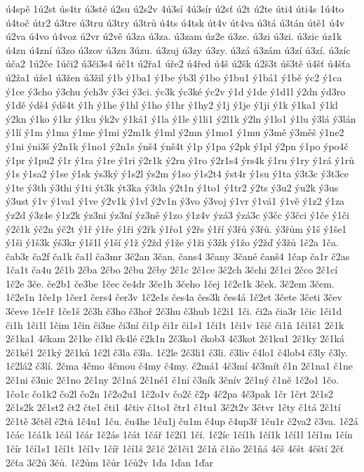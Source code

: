 {ú4spě
1ú2st
ús4tr
ú3sté
ú2su
ú2s2v
4ú3sí
4ú3sír
ú2sť
ú2t
ú2te
úti4
úti4s
1ú4to
ú4toč
útr2
ú3tre
ú3tru
ú3try
ú3trů
ú4ts
ú4tsk
út4v
út4va
ú3tá
ú3tán
útě1
ú4v
ú2va
ú4vo
ú4voz
ú2vr
ú2vě
ú3za
ú3za.
ú3zam
úz2e
ú3ze.
ú3zi
ú3zi.
ú3zic
úz1k
ú4zn
ú4zní
ú3zo
ú3zov
ú3zu
3úzu.
ú3zuj
ú3zy
ú3zy.
ú3zá
ú3zám
ú3zí
ú3zí.
ú3zíc
úča2
1ú2če
1úči2
ú3či3s4
úč1t
ú2řa1
úře2
ú4řed
ú4š
ú2šk
ú2š3t
úš3tě
ú4šť
ú4šťa
ú2ža1
úže1
ú3žen
ú3žil
ý1b
ý1ba1
ý1be
ýb3l
ý1bo
ý1bu1
ý1bá1
ý1bě
ýc2
ý1ca
ý1ce
ý3cho
ý3chu
ých3v
ý3ci
ý3ci.
ýc3k
ýc3ké
ýc2v
ý1d
ý1de
ý1d1l
ý2dn
ýd3ro
ý1dě
ýdš4
ýdš4t
ý1h
ý1he
ý1hl
ý1ho
ý1hr
ý1hy2
ý1j
ý1je
ý1ji
ý1k
ý1ka1
ý1kl
ý2kn
ý1ko
ý1kr
ý1ku
ýk2v
ý1ká1
ý1la
ý1le
ý1li1
ý2l1k
ý2ln
ý1lo1
ý1lu
ý3lá
ý3lán
ý1lí
ý1m
ý1ma
ý1me
ý1mi
ý2m1k
ý1ml
ý2mn
ý1mo1
ý1mu
ý3mě
ý3měš
ý1ne2
ý1ni
ýni3š
ý2n1k
ý1no1
ý2n1s
ýnš4
ýnš4t
ý1p
ý1pa
ý2pk
ý1pl
ý2pn
ý1po
ýpo4č
ý1pr
ý1pu2
ý1r
ý1ra
ý1re
ý1ri
ý2r1k
ý2rn
ý1ro
ý2r1s4
ýrs4k
ý1ru
ý1ry
ý1rá
ý1rů
ý1s
ý1sa2
ý1se
ý1sk
ýs3ký
ý1s2l
ýs2m
ý1so
ý1s2t4
ýst4r
ý1su
ý1ta
ý3t3c
ý3t3ce
ý1te
ý3th
ý3thi
ý1ti
ýt3k
ýt3ka
ý3tla
ý2t1n
ý1to1
ý1tr2
ý2ts
ý3u2
ýu2k
ý3us
ý3ust
ý1v
ý1va1
ý1ve
ý2v1k
ý1vl
ý2v1n
ý3vo
ý3voj
ý1vr
ý1vá1
ý1vě
ý1z2
ý1za
ýz2d
ý3z4e
ý1z2k
ýz3ni
ýz3ní
ýz3ně
ý1zo
ý1z4v
ýzá3
ýzá3c
ý3čc
ý3čci
ý1če
ý1či
ý2č1k
ýč2n
ýč2t
ý1ř
ý1ře
ý1ři
ý2řk
ý1řo1
ý2řs
ý1ří
ý3řů
ý3řů.
ý3řům
ý1š
ý1še1
ý1ši
ý1š3k
ýš3kr
ý1š1l
ý1ší
ý1ž
ý2žd
ý1že
ý1ži
ý3žk
ý1žo
ý2žď
ý3žů
1č2a
1ča.
čab3r
ča2f
ča1k
ča1l
ča3mr
3č2an
3čan.
čans4
3čany
3čané
čanš4
1čap
ča1r
č2as
1ča1t
ča4u
2č1b
2čba
2čbo
2čbu
2čby
2č1c
2č1ce
3č2ch
3čchi
2č1ci
2čco
2č1cí
1č2e
3če.
če2b1
če3be
1čec
če4dr
3če1h
3čeho
1čej
1č2e1k
3ček.
3č2em
3čem.
1č2e1n
1če1p
1čer1
čers4
čer3v
1č2e1s
čes4a
čes3k
čes4á
1č2et
3čete
3četi
3čev
3čeve
1če1ř
1če1š
2č3h
č3ho
č3hoř
2č3hu
č3hub
1č2i1
1či.
či2a
čia3r
1čic
1či1d
či1h
1či1l
1čim
1čin
či3ne
či3ní
či1p
či1r
či1s1
1či1t
1či1v
1čič
či1ň
1či1š1
2č1k
2č1ka1
4čkam
2č1ke
č1kl
čk4lé
č2k1n
2č3ko1
čkob3
4č3kot
2č1ku1
2č1ky
2č1ká
2č1ké1
2č1ký
2č1ků
1č2l
č3la
č3la.
1č2le
2č3li1
č3li.
č3liv
č4lo1
č4lob4
č3ly
č3ly.
1č2lá2
č3lí.
2čma
4čmo
4čmou
č4my
č4my.
č2má1
4č3mí
4č3mít
č1n
2č1na1
č1ne
2č1ni
č3nic
2č1no
2č1ny
2č1ná
2č1né1
č1ní
č3ník
3čnív
2č1ný
č1ně
1č2o1
1čo.
1čo1c
čo1k2
čo2l
čo2n
1č2o2u1
1č2o1v
čo2č
č2p
4č2pa
4č3pak
1čr
1črt
2č1s2
2č1s2k
2č1st2
čt2
čte1
čti1
4čtiv
č1to1
čtr1
č1tu1
3č2t2v
3čtvr
1čty
č1tá
2č1tí
2č1tě
3čtěl
č2tů
1č4u1
1ču.
ču4he
1ču1j
ču1m
č4up
č4up3ř
1ču1r
č2va2
č3va.
1č2á
1čác
1čá1k
1čál
1čár
1č2ás
1čát
1čář
1č2í1
1čí.
1č2íc
1čí1h
1čí1k
1čí1l
1čí1m
1čín
1čír
1čí1s1
1čí1t
1čí1v
1číř
1čí1š
2č1č
2č1či1
2č1ň
č1ňo
2č1ňá
4čš
4čšt
4čští
2čť
2čťa
3č2ů
3čů.
1č2ům
1čůr
1čů2v
1ďa
1ďan
1ďar
}
